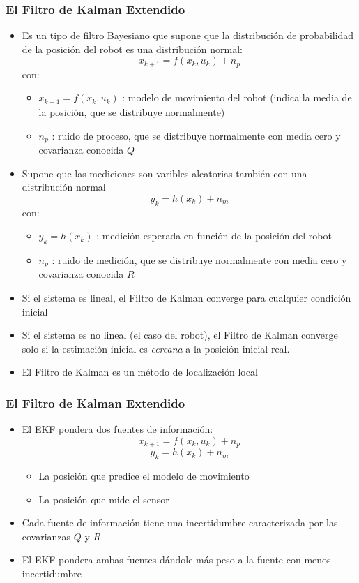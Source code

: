 \begin{frame}\frametitle{El Filtro de Kalman Extendido}
  \begin{itemize}
  \item Es un tipo de filtro Bayesiano que supone que la distribución de probabilidad de la posición del robot es una distribución normal:
    \[x_{k+1} = f(x_k, u_k) + n_p\]
    con:
    \begin{itemize}
    \item $x_{k+1} = f(x_k, u_k)$ : modelo de movimiento del robot (indica la media de la posición, que se distribuye normalmente)
    \item $n_p$ : ruido de proceso, que se distribuye normalmente con media cero y covarianza conocida $Q$
    \end{itemize}
  \item Supone que las mediciones son varibles aleatorias también con una distribución normal
    \[y_{k} = h(x_k) + n_m\]
    con:
    \begin{itemize}
    \item $y_{k} = h(x_k)$ : medición esperada en función de la posición del robot
    \item $n_p$ : ruido de medición, que se distribuye normalmente con media cero y covarianza conocida $R$
    \end{itemize}
  \item Si el sistema es lineal, el Filtro de Kalman converge para cualquier condición inicial
  \item Si el sistema es no lineal (el caso del robot), el Filtro de Kalman converge solo si la estimación inicial es \textit{cercana} a la posición inicial real.
  \item El Filtro de Kalman es un método de localización local
  \end{itemize}
\end{frame}

\begin{frame}\frametitle{El Filtro de Kalman Extendido}
  \begin{itemize}
  \item El EKF pondera dos fuentes de información:
    \[x_{k+1} = f(x_k, u_k) + n_p\]
    \[y_{k} = h(x_k) + n_m\]
    \begin{itemize}
    \item La posición que predice el modelo de movimiento
    \item La posición que mide el sensor
    \end{itemize}
  \item Cada fuente de información tiene una incertidumbre caracterizada por las covarianzas $Q$ y $R$
  \item El EKF pondera ambas fuentes dándole más peso a la fuente con menos incertidumbre
  \end{itemize}
\end{frame}

